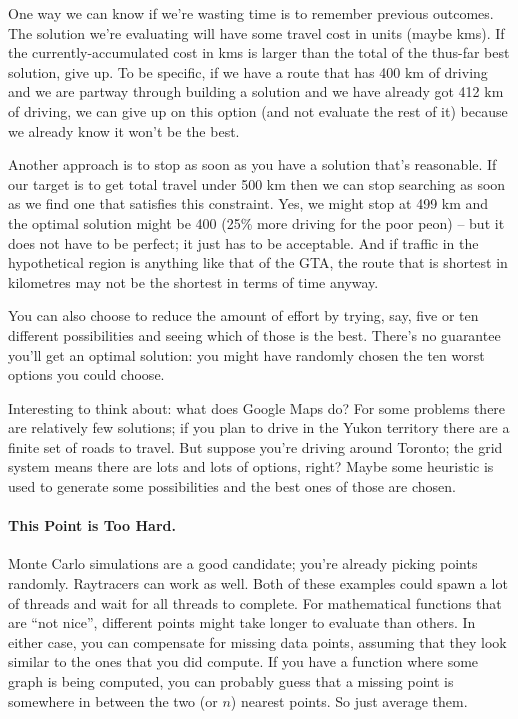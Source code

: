 \documentclass[a4paper]{report}
\begin{document}
One way we can know if we're wasting time is to remember previous outcomes. The solution we're evaluating will have some travel cost in units (maybe kms). If the currently-accumulated cost in kms is larger than the total of the thus-far best solution, give up. To be specific, if we have a route that has 400 km of driving and we are partway through building a solution and we have already got 412 km of driving, we can give up on this option (and not evaluate the rest of it) because we already know it won't be the best.

Another approach is to stop as soon as you have a solution that's reasonable. If our target is to get total travel under 500 km then we can stop searching as soon as we find one that satisfies this constraint. Yes, we might stop at 499 km and the optimal solution might be 400 (25\% more driving for the poor peon) -- but it does not have to be perfect; it just has to be acceptable. And if traffic in the hypothetical region is anything like that of the GTA, the route that is shortest in kilometres may not be the shortest in terms of time anyway.

You can also choose to reduce the amount of effort by trying, say, five or ten different possibilities and seeing which of those is the best. There's no guarantee you'll get an optimal solution: you might have randomly chosen the ten worst options you could choose. 

Interesting to think about: what does Google Maps do? For some problems there are relatively few solutions; if you plan to drive in the Yukon territory there are a finite set of roads to travel. But suppose you're driving around Toronto; the grid system means there are lots and lots of options, right? Maybe some heuristic is used to generate some possibilities and the best ones of those are chosen.


\paragraph{This Point is Too Hard.} Monte Carlo simulations
are a good candidate; you're already picking points randomly.
Raytracers can work as well. Both of these examples could spawn a lot
of threads and wait for all threads to complete. For mathematical functions that are ``not nice'', different points might take longer to evaluate than others. 
In either case, you
can compensate for missing data points, assuming that they look similar to
the ones that you did compute. If you have a function where some graph is being
computed, you can probably guess that a missing point is somewhere in between the two (or $n$) nearest points. So just average them.
\end{document}
